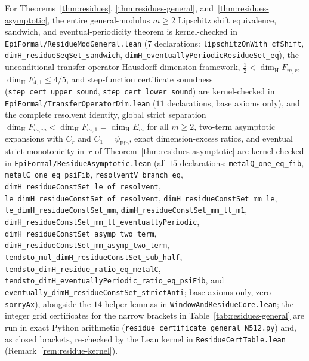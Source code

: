 \documentclass[11pt]{article}
\theoremstyle{definition}
\theoremstyle{remark}
\newcommand{\dimH}{\dim_{\mathrm{H}}}
\begin{document}
For Theorems~\ref{thm:residues}, \ref{thm:residues-general}, and~\ref{thm:residues-asymptotic}, the entire general-modulus $m\ge2$ Lipschitz shift equivalence, sandwich, and eventual-periodicity theorem is kernel-checked in \texttt{EpiFormal/\allowbreak Residue\allowbreak ModGeneral.lean} ($7$ declarations: \texttt{lipschitz\allowbreak OnWith\_\allowbreak cfShift}, \texttt{dimH\_\allowbreak residueSeqSet\_\allowbreak sandwich}, \texttt{dimH\_\allowbreak eventually\allowbreak PeriodicResidueSet\_\allowbreak eq}), the unconditional transfer-operator Hausdorff-dimension framework, $\frac12<\dimH F_{m,r}$, $\dimH F_{4,1}\le 4/5$, and step-function certificate soundness (\texttt{step\_\allowbreak cert\_\allowbreak upper\_\allowbreak sound}, \texttt{step\_\allowbreak cert\_\allowbreak lower\_\allowbreak sound}) are kernel-checked in \texttt{EpiFormal/\allowbreak Transfer\allowbreak Operator\allowbreak Dim.lean} ($11$ declarations, base axioms only), and the complete resolvent identity, global strict separation $\dimH F_{m,m}<\dimH F_{m,1}=\dimH E_m$ for all $m\ge2$, two-term asymptotic expansions with $C_r$ and $C_1=\psi_{\mathrm{Fib}}$, exact dimension-excess ratios, and eventual strict monotonicity in~$r$ of Theorem~\ref{thm:residues-asymptotic} are kernel-checked in \texttt{EpiFormal/\allowbreak Residue\allowbreak Asymptotic.lean} (all $15$ declarations: \texttt{metalQ\_\allowbreak one\_\allowbreak eq\_\allowbreak fib}, \texttt{metalC\_\allowbreak one\_\allowbreak eq\_\allowbreak psiFib}, \texttt{resolventV\_\allowbreak branch\_\allowbreak eq}, \texttt{dimH\_\allowbreak residueConstSet\_\allowbreak le\_\allowbreak of\_\allowbreak resolvent}, \texttt{le\_\allowbreak dimH\_\allowbreak residueConstSet\_\allowbreak of\_\allowbreak resolvent}, \texttt{dimH\_\allowbreak residueConstSet\_\allowbreak mm\_\allowbreak le}, \texttt{le\_\allowbreak dimH\_\allowbreak residueConstSet\_\allowbreak mm}, \texttt{dimH\_\allowbreak residueConstSet\_\allowbreak mm\_\allowbreak lt\_\allowbreak m1}, \texttt{dimH\_\allowbreak residueConstSet\_\allowbreak mm\_\allowbreak lt\_\allowbreak eventuallyPeriodic}, \texttt{dimH\_\allowbreak residueConstSet\_\allowbreak asymp\_\allowbreak two\_\allowbreak term}, \texttt{dimH\_\allowbreak residueConstSet\_\allowbreak mm\_\allowbreak asymp\_\allowbreak two\_\allowbreak term}, \texttt{tendsto\_\allowbreak mul\_\allowbreak dimH\_\allowbreak residueConstSet\_\allowbreak sub\_\allowbreak half}, \texttt{tendsto\_\allowbreak dimH\_\allowbreak residue\_\allowbreak ratio\_\allowbreak eq\_\allowbreak metalC}, \texttt{tendsto\_\allowbreak dimH\_\allowbreak eventuallyPeriodic\_\allowbreak ratio\_\allowbreak eq\_\allowbreak psiFib}, and \texttt{eventually\_\allowbreak dimH\_\allowbreak residueConstSet\_\allowbreak strictAnti}; base axioms only, zero \texttt{sorryAx}), alongside the $14$ helper lemmas in \texttt{Window\allowbreak And\allowbreak Residue\allowbreak Core.lean}; the integer grid certificates for the narrow brackets in Table~\ref{tab:residues-general} are run in exact Python arithmetic (\texttt{residue\_\allowbreak certificate\_\allowbreak general\_\allowbreak N512.py}) and, as closed brackets, re-checked by the Lean kernel in \texttt{Residue\allowbreak Cert\allowbreak Table.lean} (Remark~\ref{rem:residue-kernel}).
\end{document}

